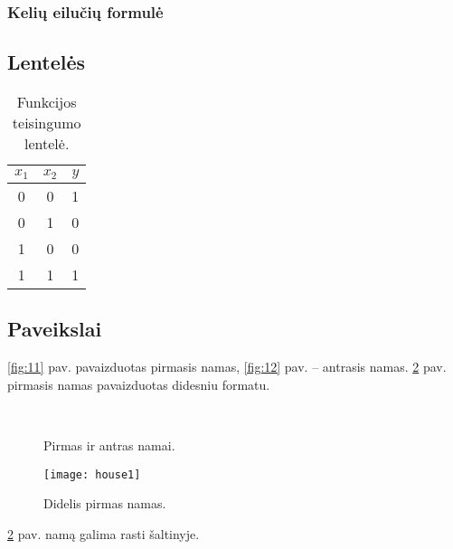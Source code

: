 \documentclass[12pt]{article}
\begin{document}
\subsubsection{Kelių eilučių formulė} \label{keliu}
      
 

 
\subsection{Lentelės} \label{lenteles}

\begin{table}[!htbp]
\caption{Funkcijos teisingumo lentelė.}
	\centering
	\begin{tabular}{|cc|c|}
		\hline
		$x_1$ & $x_2$ & $y$ \\
		\hline
		0 & 0 & 1 \\
		0 & 1 & 0 \\
		1 & 0 & 0 \\
		1 & 1 & 1 \\
		\hline
	\end{tabular}
\end{table}


\subsection{Paveikslai} \label{paveikslai}

\ref{fig:11} pav. pavaizduotas pirmasis namas, \ref{fig:12} pav. -- antrasis namas. \ref{fig:2} pav. pirmasis namas pavaizduotas didesniu formatu. 

\begin{figure}[!htbp] 
\centering
{}\ %
\caption{Pirmas ir antras namai.}
\label{fig:1} 
\end{figure} 

\begin{figure}[!htbp]
\centering
	\texttt{[image: house1]}
	\caption{Didelis pirmas namas.}
	\label{fig:2}
\end{figure}

\ref{fig:2} pav. namą galima rasti \cite{namas} šaltinyje.

\newpage

\end{document}
